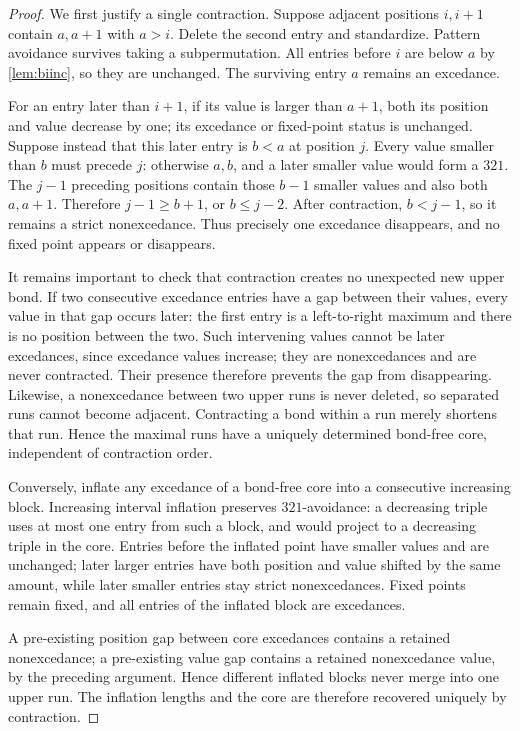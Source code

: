 \documentclass[11pt,letterpaper]{article}
\numberwithin{equation}{section}
\theoremstyle{definition}
\begin{document}
\begin{proof}
We first justify a single contraction. Suppose adjacent positions
$i,i+1$ contain $a,a+1$ with $a>i$. Delete the second entry and
standardize. Pattern avoidance survives taking a subpermutation.
All entries before $i$ are below $a$ by \cref{lem:biinc}, so they are
unchanged. The surviving entry $a$ remains an excedance.

For an entry later than $i+1$, if its value is larger than $a+1$, both
its position and value decrease by one; its excedance or fixed-point
status is unchanged. Suppose instead that this later entry is $b<a$
at position $j$. Every value smaller than $b$ must precede $j$:
otherwise $a,b$, and a later smaller value would form a $321$.
The $j-1$ preceding positions contain those $b-1$ smaller values and
also both $a,a+1$. Therefore $j-1\ge b+1$, or $b\le j-2$.
After contraction, $b<j-1$, so it remains a strict nonexcedance.
Thus precisely one excedance disappears, and no fixed point appears or
disappears.

It remains important to check that contraction creates no unexpected
new upper bond. If two consecutive excedance entries have a gap between
their values, every value in that gap occurs later: the first entry is
a left-to-right maximum and there is no position between the two.
Such intervening values cannot be later excedances, since excedance
values increase; they are nonexcedances and are never contracted.
Their presence therefore prevents the gap from disappearing.
Likewise, a nonexcedance between two upper runs is never deleted, so
separated runs cannot become adjacent. Contracting a bond within a
run merely shortens that run. Hence the maximal runs have a uniquely
determined bond-free core, independent of contraction order.

Conversely, inflate any excedance of a bond-free core into a consecutive
increasing block. Increasing interval inflation preserves $321$-avoidance:
a decreasing triple uses at most one entry from such a block, and would
project to a decreasing triple in the core. Entries before the inflated
point have smaller values and are unchanged; later larger entries have
both position and value shifted by the same amount, while later smaller
entries stay strict nonexcedances. Fixed points remain fixed, and all
entries of the inflated block are excedances.

A pre-existing position gap between core excedances contains a retained
nonexcedance; a pre-existing value gap contains a retained nonexcedance
value, by the preceding argument. Hence different inflated blocks never
merge into one upper run. The inflation lengths and the core are
therefore recovered uniquely by contraction.


\end{proof}
\end{document}
